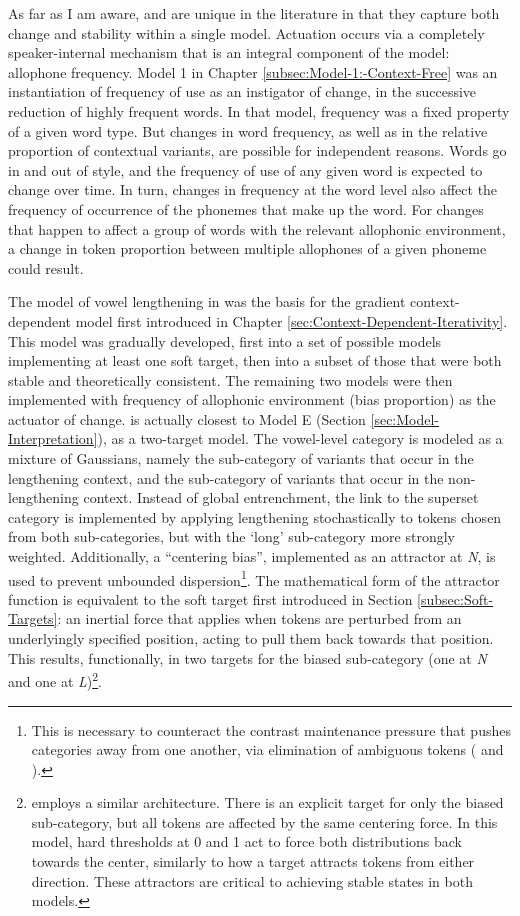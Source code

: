 As far as I am aware, \citet{soskuthy2013phonetic} and \citet{Soskuthy2015}
are unique in the literature in that they capture both change and
stability within a single model. Actuation occurs via a completely
speaker-internal mechanism that is an integral component of the model:
allophone frequency. Model 1 in Chapter \ref{subsec:Model-1:-Context-Free}
was an instantiation of frequency of use as an instigator of change,
in the successive reduction of highly frequent words. In that model,
frequency was a fixed property of a given word type. But changes in
word frequency, as well as in the relative proportion of contextual
variants, are possible for independent reasons. Words go in and out
of style, and the frequency of use of any given word is expected to
change over time. In turn, changes in frequency at the word level
also affect the frequency of occurrence of the phonemes that make
up the word. For changes that happen to affect a group of words with
the relevant allophonic environment, a change in token proportion
between multiple allophones of a given phoneme could result. 

The model of vowel lengthening in \citet{soskuthy2013phonetic} was
the basis for the gradient context-dependent model first introduced
in Chapter \ref{sec:Context-Dependent-Iterativity}. This model was
gradually developed, first into a set of possible models implementing
at least one soft target, then into a subset of those that were both
stable and theoretically consistent. The remaining two models were
then implemented with frequency of allophonic environment (bias proportion)
as the actuator of change. \citet{soskuthy2013phonetic} is actually
closest to Model E (Section \ref{sec:Model-Interpretation}), as a
two-target  model. The vowel-level category is modeled
as a mixture of Gaussians, namely the sub-category of variants that
occur in the lengthening context, and the sub-category of variants
that occur in the non-lengthening context. Instead of global entrenchment,
the link to the superset category is implemented by applying lengthening
stochastically to tokens chosen from both sub-categories, but with
the `long' sub-category more strongly weighted. Additionally, a “centering
bias”, implemented as an attractor at \emph{N}, is used to prevent
unbounded dispersion\footnote{This is necessary to counteract the contrast maintenance pressure
that pushes categories away from one another, via elimination of ambiguous
tokens (\citet{Wedel2008} and \citet{Blevins2009}). }. The mathematical form of the attractor function is equivalent to
the soft target first introduced in Section \ref{subsec:Soft-Targets}:
an inertial force that applies when tokens are perturbed from an underlyingly
specified position, acting to pull them back towards that position.
This results, functionally, in two targets for the biased sub-category
(one at \emph{N} and one at \emph{L})\footnote{\citet{Soskuthy2015} employs a similar architecture. There is an
explicit target for only the biased sub-category, but all tokens are
affected by the same centering force. In this model, hard thresholds
at 0 and 1 act to force both distributions back towards the center,
similarly to how a target attracts tokens from either direction. These
attractors are critical to achieving stable states in both models.}. 

